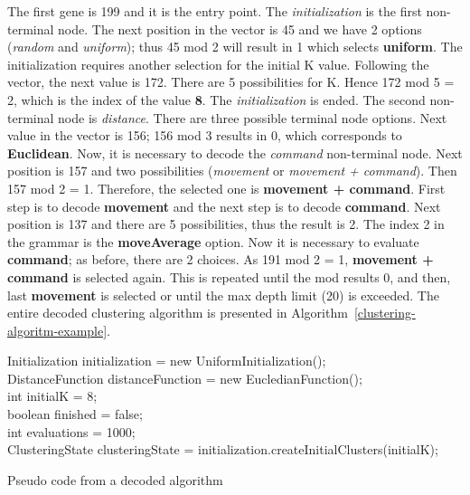 \documentclass[journal]{IEEEtran}
\begin{document}
	The first gene is 199 and it is the entry point. The \textit{initialization} is the first non-terminal node. The next position in the vector is 45 and we have 2 options (\textit{random} and \textit{uniform}); thus 45 mod 2 will result in 1 which selects \textbf{uniform}. The initialization requires another selection for the initial K value. Following the vector, the next value is 172. There are 5 possibilities for K. Hence 172 mod 5 = 2, which is the index of the value \textbf{8}. The \textit{initialization} is ended. The second non-terminal node is \textit{distance}. There are three possible terminal node options. Next value in the vector is 156; 156 mod 3 results in 0, which corresponds to \textbf{Euclidean}. Now, it is necessary to decode the \textit{command} non-terminal node. Next position is 157 and two possibilities (\textit{movement} or \textit{movement + command}). Then 157 mod 2 = 1. Therefore, the selected one is \textbf{movement + command}. First step is to decode \textbf{movement} and the next step  is to  decode  \textbf{command}. Next position is 137 and there are 5 possibilities, thus the result is 2. The index 2 in the grammar is the \textbf{moveAverage} option. Now it is necessary to evaluate \textbf{command}; as before, there are 2 choices. As 191 mod 2 = 1, \textbf{movement + command} is selected again. This is repeated until the mod results 0,  and then, last \textbf{movement} is selected or until the max depth limit (20) is exceeded. The entire decoded clustering algorithm is presented in Algorithm~\ref{clustering-algoritm-example}.
	
	\begin{algorithm}[!htb]
		\label{clustering-algoritm-example}
		Initialization initialization = new UniformInitialization(); \\
		DistanceFunction distanceFunction = new EucledianFunction(); \\
		int initialK = 8; \\
		boolean finished = false; \\
		int evaluations = 1000;\\
		ClusteringState 
		clusteringState = initialization.createInitialClusters(initialK); \\
		\caption{Pseudo code from a decoded algorithm}
	\end{algorithm}
	
\end{document}
